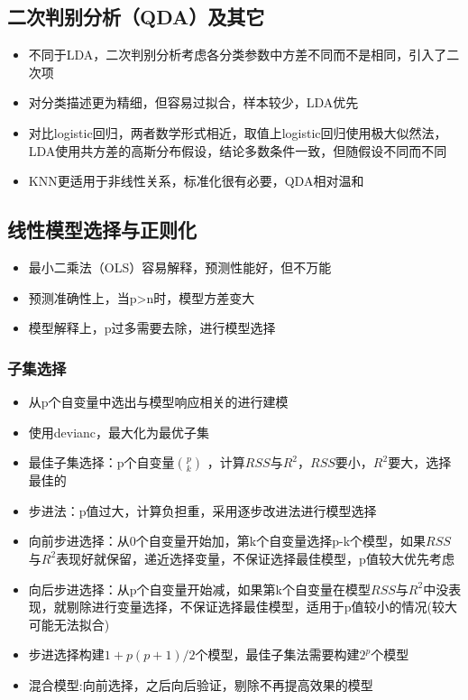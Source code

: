 \documentclass[]{book}
\providecommand{\tightlist}{%
  \setlength{\itemsep}{0pt}\setlength{\parskip}{0pt}}
\begin{document}
\hypertarget{qda}{%
\subsection{二次判别分析（QDA）及其它}\label{qda}}

\begin{itemize}
\tightlist
\item
  不同于LDA，二次判别分析考虑各分类参数中方差不同而不是相同，引入了二次项
\item
  对分类描述更为精细，但容易过拟合，样本较少，LDA优先
\item
  对比logistic回归，两者数学形式相近，取值上logistic回归使用极大似然法，LDA使用共方差的高斯分布假设，结论多数条件一致，但随假设不同而不同
\item
  KNN更适用于非线性关系，标准化很有必要，QDA相对温和
\end{itemize}

\subsection{线性模型选择与正则化}

\begin{itemize}
\tightlist
\item
  最小二乘法（OLS）容易解释，预测性能好，但不万能
\item
  预测准确性上，当p\textgreater{}n时，模型方差变大
\item
  模型解释上，p过多需要去除，进行模型选择
\end{itemize}

\subsubsection{子集选择}

\begin{itemize}
\tightlist
\item
  从p个自变量中选出与模型响应相关的进行建模
\item
  使用devianc，最大化为最优子集
\item
  最佳子集选择：p个自变量\(p \choose k\) ，计算\(RSS\)与\(R^2\)，\(RSS\)要小，\(R^2\)要大，选择最佳的
\item
  步进法：p值过大，计算负担重，采用逐步改进法进行模型选择
\item
  向前步进选择：从0个自变量开始加，第k个自变量选择p-k个模型，如果\(RSS\)与\(R^2\)表现好就保留，递近选择变量，不保证选择最佳模型，p值较大优先考虑
\item
  向后步进选择：从p个自变量开始减，如果第k个自变量在模型\(RSS\)与\(R^2\)中没表现，就剔除进行变量选择，不保证选择最佳模型，适用于p值较小的情况(较大可能无法拟合)
\item
  步进选择构建\(1 + p(p+1)/2\)个模型，最佳子集法需要构建\(2^p\)个模型
\item
  混合模型:向前选择，之后向后验证，剔除不再提高效果的模型
\end{itemize}
\end{document}
